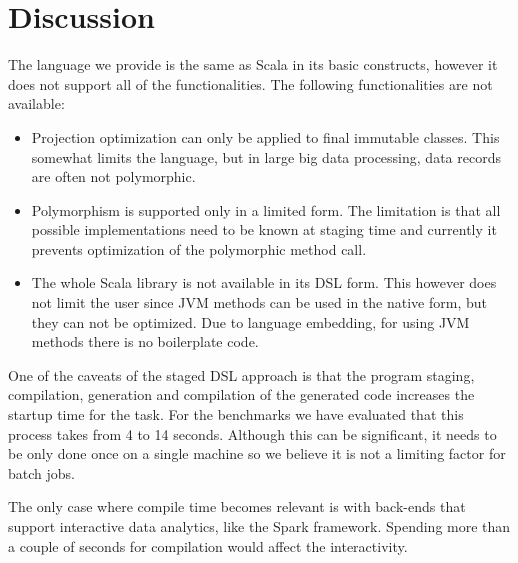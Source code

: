 \section{Discussion}
\label{sec:discussion}

The language we provide is the same as Scala in its basic constructs, however it does not support all of the functionalities. The following functionalities are not available:  
\begin{itemize}
\item Projection optimization can only be applied to final immutable classes. This somewhat limits the language, but in large big data processing, data records are often not polymorphic. 
\item Polymorphism is supported only in a limited form. The limitation is that all possible implementations need to be known at staging time and currently it prevents optimization of the polymorphic method call.
\item The whole Scala library is not available in its DSL form. This however does not limit the user since JVM methods can be used in the native form, but they can not be optimized. Due to language embedding, for using JVM methods there is no boilerplate code. 
\end{itemize}



One of the caveats of the staged DSL approach is that the program staging, compilation, generation and compilation of the generated code increases the startup time for the task. For the benchmarks we have evaluated that this process takes from 4 to 14 seconds. Although this can be significant, it needs to be only done once on a single machine so we believe it is not a limiting factor for batch jobs.

The only case where compile time becomes relevant is with back-ends that support interactive data analytics, like the Spark framework. Spending more than a couple of seconds for compilation would affect the interactivity.

